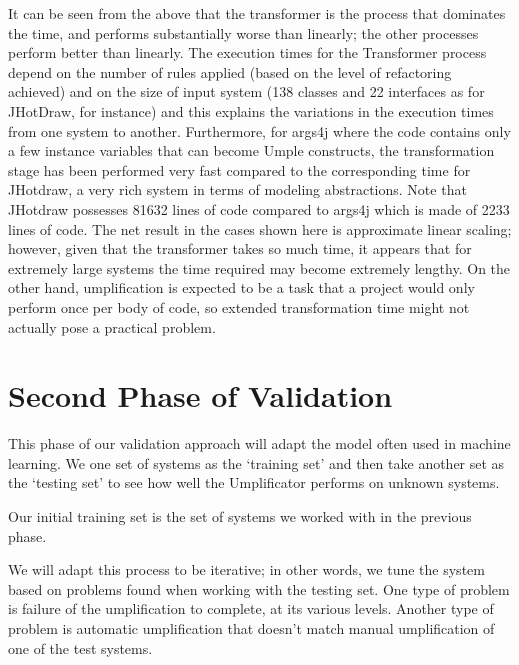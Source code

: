 It can be seen from the above that the transformer is the process that dominates the time, and performs substantially worse than linearly; the other processes perform better than linearly. The execution times for the Transformer process depend on the number of rules applied (based on the level of refactoring achieved) and on the size of input system (138 classes and 22 interfaces as for JHotDraw, for instance) and this explains the variations in the execution times from one system to another. Furthermore, for args4j where the code contains only a few instance variables that can become Umple constructs, the transformation stage has been performed very fast compared to the corresponding time for JHotdraw, a very rich system in terms of modeling abstractions. Note that JHotdraw possesses 81632 lines of code compared to args4j which is made of 2233 lines of code. The net result in the cases shown here is approximate linear scaling; however, given that the transformer takes so much time, it appears that for extremely large systems the time required may become extremely lengthy. On the other hand, umplification is expected to be a task that a project would only perform once per body of code, so extended transformation time might not actually pose a practical problem.

\section{Second Phase of Validation}

This phase of our validation approach will adapt the model often used in machine learning. We one set of systems as the `training set' and then take another set as the `testing set' to see how well the Umplificator performs on unknown systems.

Our initial training set is the set of systems we worked with in the previous phase.

We will adapt this process to be iterative; in other words, we  tune the system based on problems found when working with the testing set. One type of problem is  failure of the umplification to complete, at its various levels. Another type of problem is automatic umplification that doesn't match manual umplification of one of the test systems.

